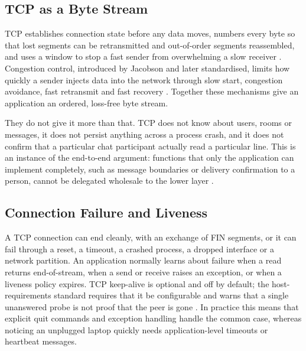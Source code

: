 \documentclass[conference]{IEEEtran}
\begin{document}
\subsection{TCP as a Byte Stream}
TCP establishes connection state before any data moves, numbers every byte so that lost segments can be retransmitted and out-of-order segments reassembled, and uses a window to stop a fast sender from overwhelming a slow receiver \cite{rfc793,rfc9293}. Congestion control, introduced by Jacobson and later standardised, limits how quickly a sender injects data into the network through slow start, congestion avoidance, fast retransmit and fast recovery \cite{jacobson,rfc5681}. Together these mechanisms give an application an ordered, loss-free byte stream.

They do not give it more than that. TCP does not know about users, rooms or messages, it does not persist anything across a process crash, and it does not confirm that a particular chat participant actually read a particular line. This is an instance of the end-to-end argument: functions that only the application can implement completely, such as message boundaries or delivery confirmation to a person, cannot be delegated wholesale to the lower layer \cite{saltzer}.

\subsection{Connection Failure and Liveness}
A TCP connection can end cleanly, with an exchange of FIN segments, or it can fail through a reset, a timeout, a crashed process, a dropped interface or a network partition. An application normally learns about failure when a read returns end-of-stream, when a send or receive raises an exception, or when a liveness policy expires. TCP keep-alive is optional and off by default; the host-requirements standard requires that it be configurable and warns that a single unanswered probe is not proof that the peer is gone \cite{rfc1122}. In practice this means that explicit quit commands and exception handling handle the common case, whereas noticing an unplugged laptop quickly needs application-level timeouts or heartbeat messages.
\end{document}
